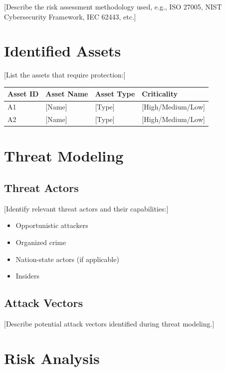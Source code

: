 \documentclass[
  11 pt,
  a4paper,
  table]{report}
\providecommand{\tightlist}{%
  \setlength{\itemsep}{0pt}\setlength{\parskip}{0pt}}\usepackage{longtable,booktabs,array}
\begin{document}
{[}Describe the risk assessment methodology used, e.g., ISO 27005, NIST
Cybersecurity Framework, IEC 62443, etc.{]}

\section{Identified Assets}\label{identified-assets}

{[}List the assets that require protection:{]}

\begin{longtable}[]{@{}llll@{}}
\toprule\noalign{}
Asset ID & Asset Name & Asset Type & Criticality \\
\midrule\noalign{}
\endhead
\bottomrule\noalign{}
\endlastfoot
A1 & {[}Name{]} & {[}Type{]} & {[}High/Medium/Low{]} \\
A2 & {[}Name{]} & {[}Type{]} & {[}High/Medium/Low{]} \\
\end{longtable}

\section{Threat Modeling}\label{threat-modeling}

\subsection{Threat Actors}\label{threat-actors}

{[}Identify relevant threat actors and their capabilities:{]}

\begin{itemize}
\tightlist
\item
  Opportunistic attackers
\item
  Organized crime
\item
  Nation-state actors (if applicable)
\item
  Insiders
\end{itemize}

\subsection{Attack Vectors}\label{attack-vectors}

{[}Describe potential attack vectors identified during threat
modeling.{]}

\section{Risk Analysis}\label{risk-analysis}
\end{document}
